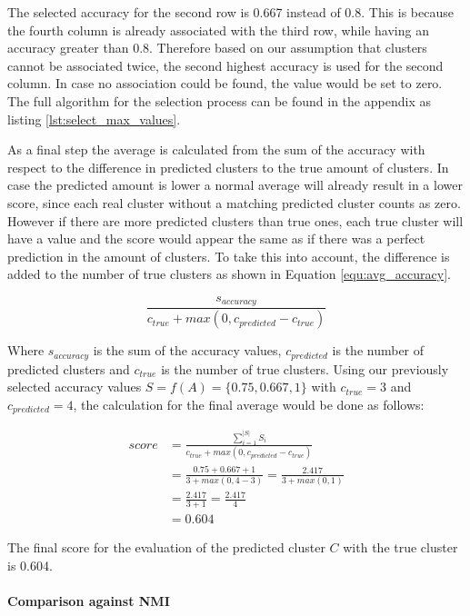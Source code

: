 The selected accuracy for the second row is 0.667 instead of 0.8. This is because the fourth column is already associated with the third row, while having an accuracy greater than 0.8. Therefore based on our assumption that clusters cannot be associated twice, the second highest accuracy is used for the second column. In case no association could be found, the value would be set to zero. The full algorithm for the selection process can be found in the appendix as listing \ref{lst:select_max_values}.

As a final step the average is calculated from the sum of the accuracy with respect to the difference in predicted clusters to the true amount of clusters. In case the predicted amount is lower a normal average will already result in a lower score, since each real cluster without a matching predicted cluster counts as zero. However if there are more predicted clusters than true ones, each true cluster will have a value and the score would appear the same as if there was a perfect prediction in the amount of clusters. To take this into account, the difference is added to the number of true clusters as shown in Equation \ref{equ:avg_accuracy}.

\begin{equation}
    \label{equ:avg_accuracy}
        \frac{s_{accuracy}}{c_{true} + max(0, c_{predicted} - c_{true})}
\end{equation}

Where $s_{accuracy}$ is the sum of the accuracy values, $c_{predicted}$ is the number of predicted clusters and $c_{true}$ is the number of true clusters. Using our previously selected accuracy values $S = f(A) = \{0.75, 0.667, 1\}$ with  $c_{true}=3$ and $c_{predicted}=4$, the calculation for the final average would be done as follows:

\begin{align*}
    score &= \frac{\sum_{i=1}^{|S|} S_i}{c_{true} + max(0, c_{predicted} - c_{true})} \\
    &= \frac{0.75 + 0.667 + 1}{3 + max(0, 4 - 3)} = \frac{2.417}{3 + max(0, 1)} \\
    &= \frac{2.417}{3 + 1} = \frac{2.417}{4} \\
    &= \mathbf{0.604}
\end{align*}

The final score for the evaluation of the predicted cluster $C$ with the true cluster is 0.604.

\paragraph{Comparison against NMI}

